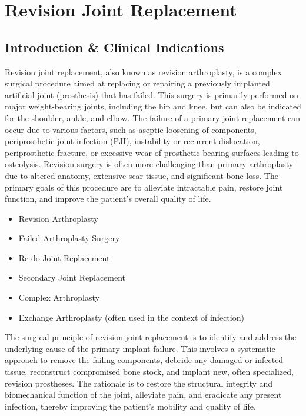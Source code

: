 \chapter{Revision Joint Replacement}

\section*{Introduction \& Clinical Indications}
Revision joint replacement, also known as revision arthroplasty, is a complex surgical procedure aimed at replacing or repairing a previously implanted artificial joint (prosthesis) that has failed. This surgery is primarily performed on major weight-bearing joints, including the hip and knee, but can also be indicated for the shoulder, ankle, and elbow. The failure of a primary joint replacement can occur due to various factors, such as aseptic loosening of components, periprosthetic joint infection (PJI), instability or recurrent dislocation, periprosthetic fracture, or excessive wear of prosthetic bearing surfaces leading to osteolysis. Revision surgery is often more challenging than primary arthroplasty due to altered anatomy, extensive scar tissue, and significant bone loss. The primary goals of this procedure are to alleviate intractable pain, restore joint function, and improve the patient's overall quality of life.

\begin{itemize}
  \item Revision Arthroplasty
  \item Failed Arthroplasty Surgery
  \item Re-do Joint Replacement
  \item Secondary Joint Replacement
  \item Complex Arthroplasty
  \item Exchange Arthroplasty (often used in the context of infection)
\end{itemize}

The surgical principle of revision joint replacement is to identify and address the underlying cause of the primary implant failure. This involves a systematic approach to remove the failing components, debride any damaged or infected tissue, reconstruct compromised bone stock, and implant new, often specialized, revision prostheses. The rationale is to restore the structural integrity and biomechanical function of the joint, alleviate pain, and eradicate any present infection, thereby improving the patient's mobility and quality of life.

